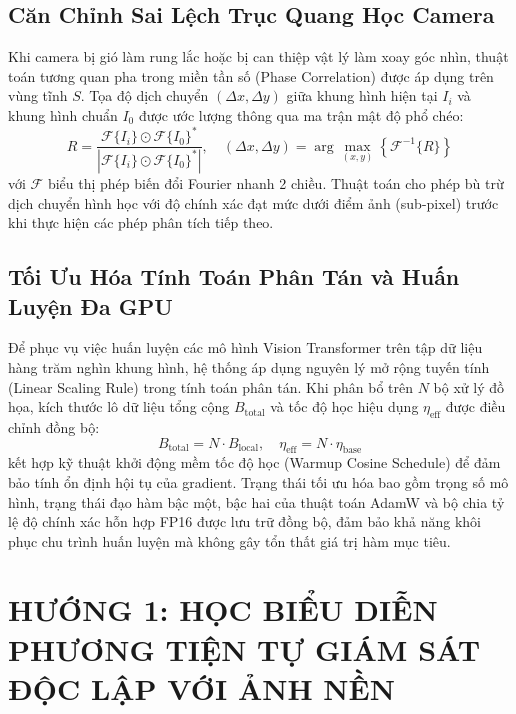 \documentclass[11pt,a4paper]{article}
\begin{document}
\subsection{Căn Chỉnh Sai Lệch Trục Quang Học Camera}
Khi camera bị gió làm rung lắc hoặc bị can thiệp vật lý làm xoay góc nhìn, thuật toán tương quan pha trong miền tần số (Phase Correlation) được áp dụng trên vùng tĩnh $S$. Tọa độ dịch chuyển $(\Delta x, \Delta y)$ giữa khung hình hiện tại $I_i$ và khung hình chuẩn $I_0$ được ước lượng thông qua ma trận mật độ phổ chéo:
\begin{equation}
    R = \frac{\mathcal{F}\{I_i\} \odot \mathcal{F}\{I_0\}^*}{\left| \mathcal{F}\{I_i\} \odot \mathcal{F}\{I_0\}^* \right|}, \quad (\Delta x, \Delta y) = \arg\max_{(x, y)} \left\{ \mathcal{F}^{-1}\{R\} \right\}
\end{equation}
với $\mathcal{F}$ biểu thị phép biến đổi Fourier nhanh 2 chiều. Thuật toán cho phép bù trừ dịch chuyển hình học với độ chính xác đạt mức dưới điểm ảnh (sub-pixel) trước khi thực hiện các phép phân tích tiếp theo.

\subsection{Tối Ưu Hóa Tính Toán Phân Tán và Huấn Luyện Đa GPU}
Để phục vụ việc huấn luyện các mô hình Vision Transformer trên tập dữ liệu hàng trăm nghìn khung hình, hệ thống áp dụng nguyên lý mở rộng tuyến tính (Linear Scaling Rule) trong tính toán phân tán. Khi phân bổ trên $N$ bộ xử lý đồ họa, kích thước lô dữ liệu tổng cộng $B_{\text{total}}$ và tốc độ học hiệu dụng $\eta_{\text{eff}}$ được điều chỉnh đồng bộ:
\begin{equation}
    B_{\text{total}} = N \cdot B_{\text{local}}, \quad \eta_{\text{eff}} = N \cdot \eta_{\text{base}}
\end{equation}
kết hợp kỹ thuật khởi động mềm tốc độ học (Warmup Cosine Schedule) để đảm bảo tính ổn định hội tụ của gradient. Trạng thái tối ưu hóa bao gồm trọng số mô hình, trạng thái đạo hàm bậc một, bậc hai của thuật toán AdamW và bộ chia tỷ lệ độ chính xác hỗn hợp FP16 được lưu trữ đồng bộ, đảm bảo khả năng khôi phục chu trình huấn luyện mà không gây tổn thất giá trị hàm mục tiêu.

\section{HƯỚNG 1: HỌC BIỂU DIỄN PHƯƠNG TIỆN TỰ GIÁM SÁT ĐỘC LẬP VỚI ẢNH NỀN}
\end{document}
